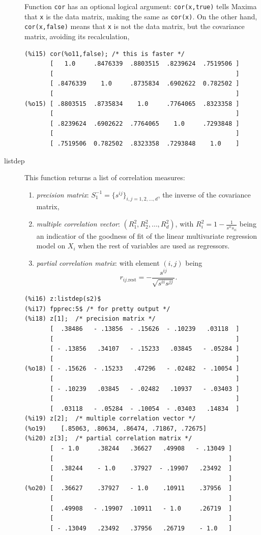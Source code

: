 \documentclass[12pt,a4paper]{article}
\begin{document}
\begin{description}
Function \verb|cor| has an optional logical argument: \verb|cor(x,true)| tells Maxima that \verb|x| is the data matrix, making the same as \verb|cor(x)|. On the other hand, \verb|cor(x,false)| means that \verb|x| is not the data matrix, but the covariance matrix, avoiding its recalculation,
\begin{verbatim}
(%i15) cor(%o11,false); /* this is faster */
       [   1.0     .8476339  .8803515  .8239624  .7519506 ]
       [                                                  ]
       [ .8476339    1.0     .8735834  .6902622  0.782502 ]
       [                                                  ]
(%o15) [ .8803515  .8735834    1.0     .7764065  .8323358 ]
       [                                                  ]
       [ .8239624  .6902622  .7764065    1.0     .7293848 ]
       [                                                  ]
       [ .7519506  0.782502  .8323358  .7293848    1.0    ]
\end{verbatim}

\item[listdep] This function returns a list of correlation measures:
\begin{enumerate}
\item \emph{precision matrix}: $S_1^{-1}=\{s^{ij}\}_{i,j = 1, 2, \ldots, d}$, the inverse of the covariance matrix,
\item \emph{multiple correlation vector}: $(R_1^2, R_2^2, \ldots, R_d^2)$, with $R_i^2=1-\frac{1}{s^{ii}s_{ii}}$ being an indicatior of the goodness of fit of the linear multivariate regression model on $X_i$ when the rest of variables are used as regressors.
\item \emph{partial correlation matrix}: with element $(i, j)$ being 
\[
r_{ij.\mbox{rest}}=-\frac{s^{ij}}{\sqrt{s^{ii} s^{jj}}}.
\]
\end{enumerate}
\begin{verbatim}
(%i16) z:listdep(s2)$
(%i17) fpprec:5$ /* for pretty output */
(%i18) z[1];  /* precision matrix */
       [  .38486   - .13856  - .15626  - .10239   .03118  ]
       [                                                  ]
       [ - .13856   .34107   - .15233   .03845   - .05284 ]
       [                                                  ]
(%o18) [ - .15626  - .15233   .47296   - .02482  - .10054 ]
       [                                                  ]
       [ - .10239   .03845   - .02482   .10937   - .03403 ]
       [                                                  ]
       [  .03118   - .05284  - .10054  - .03403   .14834  ]
(%i19) z[2];  /* multiple correlation vector */
(%o19)    [.85063, .80634, .86474, .71867, .72675]
(%i20) z[3];  /* partial correlation matrix */
       [  - 1.0     .38244   .36627   .49908   - .13049 ]
       [                                                ]
       [  .38244    - 1.0    .37927  - .19907   .23492  ]
       [                                                ]
(%o20) [  .36627    .37927   - 1.0    .10911    .37956  ]
       [                                                ]
       [  .49908   - .19907  .10911   - 1.0     .26719  ]
       [                                                ]
       [ - .13049   .23492   .37956   .26719    - 1.0   ]
\end{verbatim}


\end{description}
\end{document}
